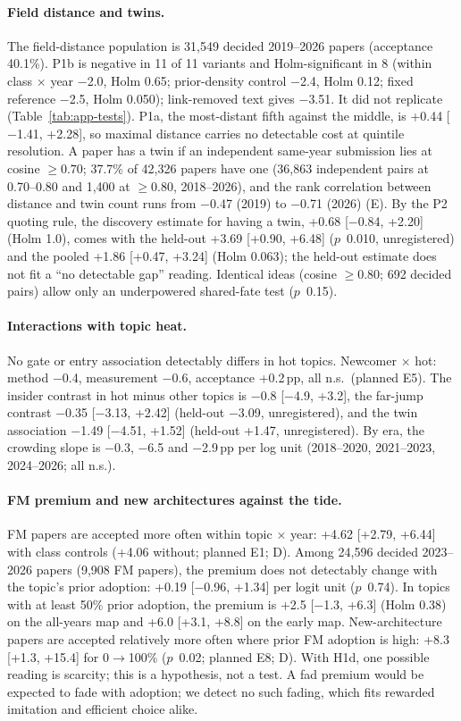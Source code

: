 \paragraph{Field distance and twins.} The field-distance population is 31,549 decided 2019--2026 papers (acceptance
40.1\%). P1b is negative in 11 of 11 variants and Holm-significant in 8 (within class $\times$ year $-$2.0, Holm 0.65;
prior-density control $-$2.4, Holm 0.12; fixed reference $-$2.5, Holm 0.050); link-removed text gives $-$3.51. It
did not replicate (Table~\ref{tab:app-tests}). P1a, the most-distant fifth against the middle, is +0.44 [$-$1.41,
+2.28], so maximal distance carries no detectable cost at quintile resolution. A paper has a twin if an independent
same-year submission lies at cosine $\geq 0.70$; 37.7\% of 42,326 papers have one (36,863 independent pairs at
0.70--0.80 and 1,400 at $\geq 0.80$, 2018--2026), and the rank correlation between distance and twin count runs from
$-$0.47 (2019) to $-$0.71 (2026) (E). By the P2 quoting rule, the discovery estimate for having a twin, +0.68
[$-$0.84, +2.20] (Holm 1.0), comes with the held-out +3.69 [+0.90, +6.48] ($p$~0.010, unregistered) and the pooled
+1.86 [+0.47, +3.24] (Holm 0.063); the held-out estimate does not fit a ``no detectable gap'' reading. Identical ideas
(cosine $\geq 0.80$; 692 decided pairs) allow only an underpowered shared-fate test ($p$~0.15).

\paragraph{Interactions with topic heat.} No gate or entry association detectably differs in hot topics. Newcomer
$\times$ hot: method $-$0.4, measurement $-$0.6, acceptance +0.2\,pp, all n.s.\ (planned E5). The insider contrast in
hot minus other topics is $-$0.8 [$-$4.9, +3.2], the far-jump contrast $-$0.35 [$-$3.13, +2.42] (held-out $-$3.09,
unregistered), and the twin association $-$1.49 [$-$4.51, +1.52] (held-out +1.47, unregistered). By era, the crowding slope is
$-$0.3, $-$6.5 and $-$2.9\,pp per log unit (2018--2020, 2021--2023, 2024--2026; all n.s.).

\paragraph{FM premium and new architectures against the tide.} FM papers are accepted more often within topic
$\times$ year: +4.62 [+2.79, +6.44] with class controls (+4.06 without; planned E1; D). Among 24,596 decided
2023--2026 papers (9,908 FM papers), the premium does not detectably change with the topic's prior adoption: +0.19
[$-$0.96, +1.34] per logit unit ($p$~0.74). In topics with at least 50\% prior adoption, the premium is +2.5 [$-$1.3,
+6.3] (Holm 0.38) on the all-years map and +6.0 [+3.1, +8.8] on the early map. New-architecture papers are accepted
relatively more often where prior FM adoption is high: +8.3 [+1.3, +15.4] for 0$\to$100\% ($p$~0.02; planned E8; D).
With H1d, one possible reading is scarcity; this is a hypothesis, not a test. A fad premium would be expected to fade
with adoption; we detect no such fading, which fits rewarded imitation and efficient choice alike.

